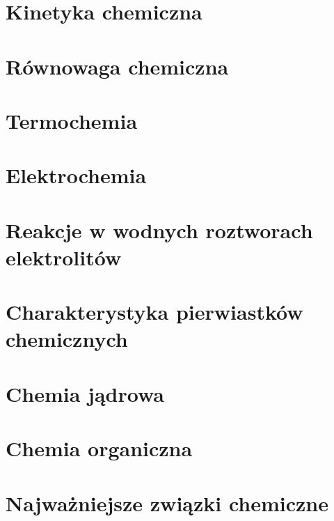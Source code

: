 \documentclass{createspace}
\begin{document}
\chapter{Kinetyka chemiczna}


\chapter{Równowaga chemiczna}


\chapter{Termochemia}


\chapter{Elektrochemia}


\chapter{Reakcje w wodnych roztworach elektrolitów}

\chapter{Charakterystyka pierwiastków chemicznych}






\chapter{Chemia jądrowa}


\chapter{Chemia organiczna}

\chapter{Najważniejsze związki chemiczne}



\end{document}
